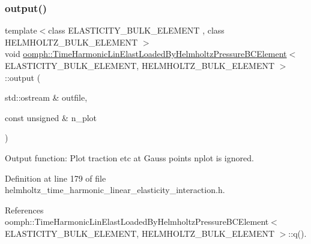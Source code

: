 \subsubsection{\texorpdfstring{output()}{output()}\hspace{0.1cm}{\footnotesize\ttfamily [2/4]}}
{\footnotesize\ttfamily template$<$class E\+L\+A\+S\+T\+I\+C\+I\+T\+Y\+\_\+\+B\+U\+L\+K\+\_\+\+E\+L\+E\+M\+E\+NT , class H\+E\+L\+M\+H\+O\+L\+T\+Z\+\_\+\+B\+U\+L\+K\+\_\+\+E\+L\+E\+M\+E\+NT $>$ \\
void \hyperlink{classoomph_1_1TimeHarmonicLinElastLoadedByHelmholtzPressureBCElement}{oomph\+::\+Time\+Harmonic\+Lin\+Elast\+Loaded\+By\+Helmholtz\+Pressure\+B\+C\+Element}$<$ E\+L\+A\+S\+T\+I\+C\+I\+T\+Y\+\_\+\+B\+U\+L\+K\+\_\+\+E\+L\+E\+M\+E\+NT, H\+E\+L\+M\+H\+O\+L\+T\+Z\+\_\+\+B\+U\+L\+K\+\_\+\+E\+L\+E\+M\+E\+NT $>$\+::output (\begin{DoxyParamCaption}\item[{std\+::ostream \&}]{outfile,  }\item[{const unsigned \&}]{n\+\_\+plot }\end{DoxyParamCaption})\hspace{0.3cm}{\ttfamily [inline]}}



Output function\+: Plot traction etc at Gauss points nplot is ignored. 



Definition at line 179 of file helmholtz\+\_\+time\+\_\+harmonic\+\_\+linear\+\_\+elasticity\+\_\+interaction.\+h.



References oomph\+::\+Time\+Harmonic\+Lin\+Elast\+Loaded\+By\+Helmholtz\+Pressure\+B\+C\+Element$<$ E\+L\+A\+S\+T\+I\+C\+I\+T\+Y\+\_\+\+B\+U\+L\+K\+\_\+\+E\+L\+E\+M\+E\+N\+T, H\+E\+L\+M\+H\+O\+L\+T\+Z\+\_\+\+B\+U\+L\+K\+\_\+\+E\+L\+E\+M\+E\+N\+T $>$\+::q().

\mbox{\label{classoomph_1_1TimeHarmonicLinElastLoadedByHelmholtzPressureBCElement_a6a1d8e8ae161b0ca0aa3de8d2a04a409}} 
